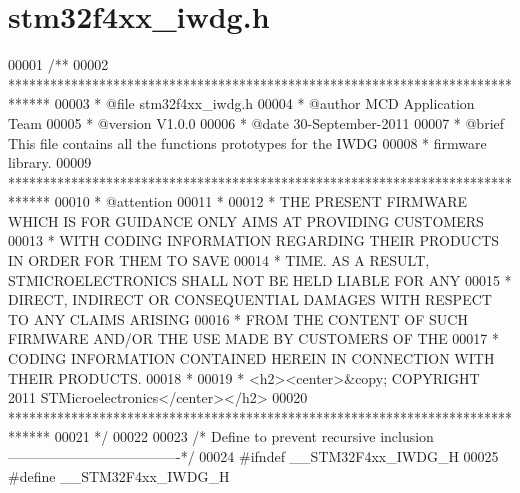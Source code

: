 \section{stm32f4xx\+\_\+iwdg.\+h}
\label{stm32f4xx__iwdg_8h_source}

\begin{DoxyCode}
00001 \textcolor{comment}{/**}
00002 \textcolor{comment}{  ******************************************************************************}
00003 \textcolor{comment}{  * @file    stm32f4xx\_iwdg.h}
00004 \textcolor{comment}{  * @author  MCD Application Team}
00005 \textcolor{comment}{  * @version V1.0.0}
00006 \textcolor{comment}{  * @date    30-September-2011}
00007 \textcolor{comment}{  * @brief   This file contains all the functions prototypes for the IWDG }
00008 \textcolor{comment}{  *          firmware library.}
00009 \textcolor{comment}{  ******************************************************************************}
00010 \textcolor{comment}{  * @attention}
00011 \textcolor{comment}{  *}
00012 \textcolor{comment}{  * THE PRESENT FIRMWARE WHICH IS FOR GUIDANCE ONLY AIMS AT PROVIDING CUSTOMERS}
00013 \textcolor{comment}{  * WITH CODING INFORMATION REGARDING THEIR PRODUCTS IN ORDER FOR THEM TO SAVE}
00014 \textcolor{comment}{  * TIME. AS A RESULT, STMICROELECTRONICS SHALL NOT BE HELD LIABLE FOR ANY}
00015 \textcolor{comment}{  * DIRECT, INDIRECT OR CONSEQUENTIAL DAMAGES WITH RESPECT TO ANY CLAIMS ARISING}
00016 \textcolor{comment}{  * FROM THE CONTENT OF SUCH FIRMWARE AND/OR THE USE MADE BY CUSTOMERS OF THE}
00017 \textcolor{comment}{  * CODING INFORMATION CONTAINED HEREIN IN CONNECTION WITH THEIR PRODUCTS.}
00018 \textcolor{comment}{  *}
00019 \textcolor{comment}{  * <h2><center>&copy; COPYRIGHT 2011 STMicroelectronics</center></h2>}
00020 \textcolor{comment}{  ******************************************************************************}
00021 \textcolor{comment}{  */}
00022 
00023 \textcolor{comment}{/* Define to prevent recursive inclusion -------------------------------------*/}
00024 \textcolor{preprocessor}{#}\textcolor{preprocessor}{ifndef} \textcolor{preprocessor}{\_\_STM32F4xx\_IWDG\_H}
00025 \textcolor{preprocessor}{#}\textcolor{preprocessor}{define} \textcolor{preprocessor}{\_\_STM32F4xx\_IWDG\_H}

\end{DoxyCode}
